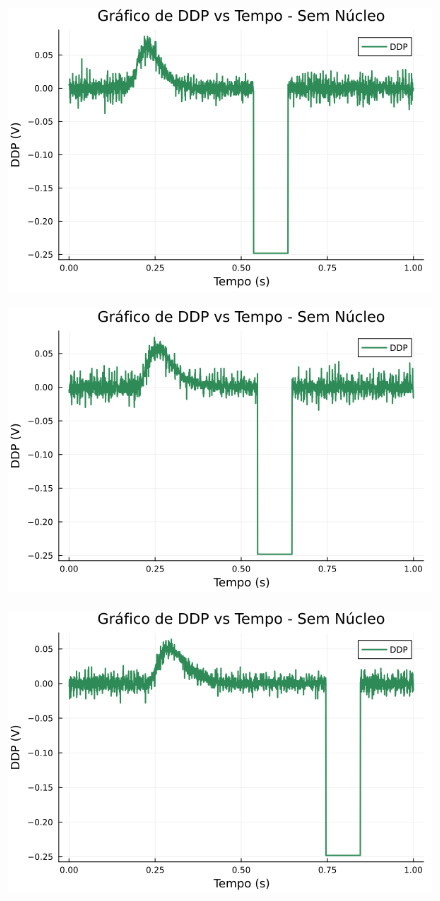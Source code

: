 \begin{center}
\begin{multicols}{2}
\begin{figure}[H]
    \centering
    \includegraphics[width=1.0\linewidth]{figuras/grafico_dados2_F0000CH1.png}
\end{figure}

\begin{figure}[H]
    \centering
    \includegraphics[width=1.0\linewidth]{figuras/grafico_dados2_F0001CH1.png}
\end{figure}

\begin{figure}[H]
    \centering
    \includegraphics[width=1.0\linewidth]{figuras/grafico_dados2_F0002CH1.png}
\end{figure}


\end{multicols}
\end{center}
